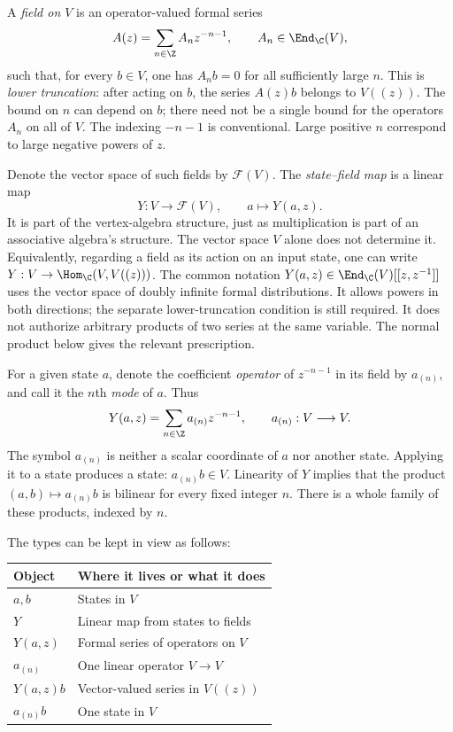 A \emph{field on $V$} is an operator-valued formal series
\[
 A(z)=\sum_{n\in\Z}A_nz^{-n-1},\qquad A_n\in\End_{\C}(V),
\]
such that, for every $b\in V$, one has $A_nb=0$ for all sufficiently
large $n$. This is \emph{lower truncation}: after acting on $b$, the
series $A(z)b$ belongs to $V((z))$. The bound on $n$ can depend on
$b$; there need not be a single bound for the operators $A_n$ on all
of $V$. The indexing $-n-1$ is conventional. Large positive $n$
correspond to large negative powers of $z$.

Denote the vector space of such fields by $\mathcal F(V)$. The
\emph{state--field map} is a linear map
\begin{equation}
 Y:V\longrightarrow\mathcal F(V),\qquad a\longmapsto Y(a,z).
 \label{eq:voa-state-field-type}
\end{equation}
It is part of the vertex-algebra structure, just as multiplication
is part of an associative algebra's structure. The vector space
$V$ alone does not determine it. Equivalently, regarding a field
as its action on an input state, one can write
$Y:V\to\Hom_{\C}(V,V((z)))$.
The common notation
$Y(a,z)\in\End_{\C}(V)[[z,z^{-1}]]$ uses the vector space of
doubly infinite formal distributions. It allows powers in both
directions; the separate lower-truncation condition is still required.
It does not authorize arbitrary products of two series at the same
variable. The normal product below gives the relevant prescription.

For a given state $a$, denote the coefficient \emph{operator} of
$z^{-n-1}$ in its field by $a_{(n)}$, and call it the $n$th
\emph{mode} of $a$. Thus
\begin{equation}
 Y(a,z)=\sum_{n\in\Z}a_{(n)}z^{-n-1},
 \qquad a_{(n)}:V\longrightarrow V.
 \label{eq:voa-mode-definition}
\end{equation}
The symbol $a_{(n)}$ is neither a scalar coordinate of $a$ nor
another state. Applying it to a state produces a state:
$a_{(n)}b\in V$. Linearity of $Y$ implies that the product
$(a,b)\mapsto a_{(n)}b$ is bilinear for every fixed integer $n$.
There is a whole family of these products, indexed by $n$.

The types can be kept in view as follows:
\begin{center}
\begin{tabular}{ll}
\toprule
Object & Where it lives or what it does\\
\midrule
$a,b$ & States in $V$\\
$Y$ & Linear map from states to fields\\
$Y(a,z)$ & Formal series of operators on $V$\\
$a_{(n)}$ & One linear operator $V\to V$\\
$Y(a,z)b$ & Vector-valued series in $V((z))$\\
$a_{(n)}b$ & One state in $V$\\
\bottomrule
\end{tabular}
\end{center}

